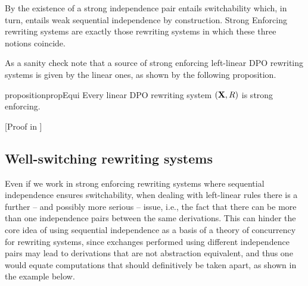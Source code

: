 \documentclass[a4paper,UKenglish,cleveref,pdftex,thm-restate,numberwithinsect,anonymous]{lipics}
\def\R{\mathsf{R}}
\def\X{\textbf {\textup{X}}}
\newcommand{\rem}[2]{{\color{blue}#1}{\color{red}#2}}
\renewcommand{\rem}[2]{}
\begin{document}
\begin{remark}
  By  the existence of a strong independence pair
  entails switchability which, in turn, entails weak sequential
  independence by construction. Strong Enforcing rewriting systems are exactly
  those rewriting systems in which these three notions coincide.
\end{remark}




As a sanity check note that a source of strong enforcing left-linear DPO rewriting systems is given by the linear ones, as shown by the following proposition.

\begin{restatable}{proposition}{propEqui}
  \label{prop:equi}
  Every linear DPO rewriting system $(\X, \R)$ is strong enforcing.
\end{restatable}
[Proof in ]

\subsection{Well-switching rewriting systems}\label{subsec:verytame}

Even if we work in strong enforcing rewriting systems where sequential
independence ensures switchability, when dealing with left-linear
rules there is a further -- and possibly more serious -- issue, i.e.,
the fact that there can be more than one independence pairs between
the same derivations. This can hinder the core idea of using
sequential independence as a basis of a theory of concurrency for
rewriting systems, since exchanges performed using different
independence pairs may lead to derivations that are not abstraction
equivalent, and thus one would equate computations that should
definitively be taken apart, as shown in the example below.
\end{document}
